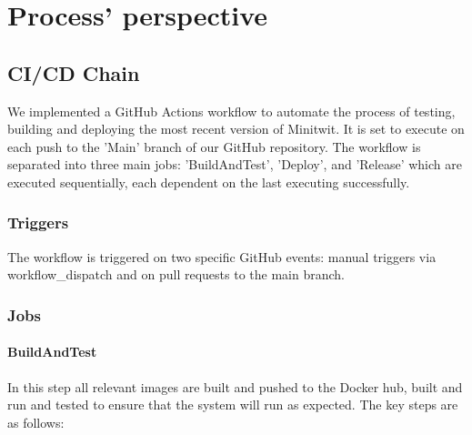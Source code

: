 \documentclass[12pt, a4paper, oneside]{book}
\begin{document}
\chapter{Process' perspective}

\section{CI/CD Chain}
We implemented a GitHub Actions workflow to automate the process of testing, building and deploying the most recent version of Minitwit. It is set to execute on each push to the 'Main' branch of our GitHub repository. The workflow is separated into three main jobs: 'BuildAndTest', 'Deploy', and 'Release' which are executed sequentially, each dependent on the last executing successfully.

\subsection{Triggers}
The workflow is triggered on two specific GitHub events: manual triggers via workflow\_dispatch and on pull requests to the main branch. 

\subsection{Jobs}
\subsubsection{BuildAndTest}
In this step all relevant images are built and pushed to the Docker hub, built and run and tested to ensure that the system will run as expected. The key steps are as follows:
\end{document}
